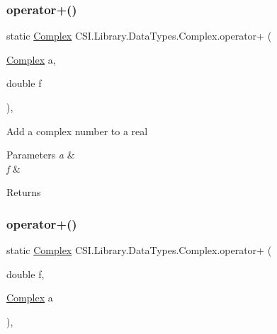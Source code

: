 \subsubsection{\texorpdfstring{operator+()}{operator+()}\hspace{0.1cm}{\footnotesize\ttfamily [1/3]}}
{\footnotesize\ttfamily static \mbox{\hyperlink{struct_c_s_i_1_1_library_1_1_data_types_1_1_complex}{Complex}} C\+S\+I.\+Library.\+Data\+Types.\+Complex.\+operator+ (\begin{DoxyParamCaption}\item[{\mbox{\hyperlink{struct_c_s_i_1_1_library_1_1_data_types_1_1_complex}{Complex}}}]{a,  }\item[{double}]{f }\end{DoxyParamCaption})\hspace{0.3cm}{\ttfamily [inline]}, {\ttfamily [static]}}



Add a complex number to a real 


\begin{DoxyParams}{Parameters}
{\em a} & \\
\hline
{\em f} & \\
\hline
\end{DoxyParams}
\begin{DoxyReturn}{Returns}

\end{DoxyReturn}
\mbox{\label{struct_c_s_i_1_1_library_1_1_data_types_1_1_complex_a1ba0b0b59df21c096c95b0f5228b5db7}} 
\subsubsection{\texorpdfstring{operator+()}{operator+()}\hspace{0.1cm}{\footnotesize\ttfamily [2/3]}}
{\footnotesize\ttfamily static \mbox{\hyperlink{struct_c_s_i_1_1_library_1_1_data_types_1_1_complex}{Complex}} C\+S\+I.\+Library.\+Data\+Types.\+Complex.\+operator+ (\begin{DoxyParamCaption}\item[{double}]{f,  }\item[{\mbox{\hyperlink{struct_c_s_i_1_1_library_1_1_data_types_1_1_complex}{Complex}}}]{a }\end{DoxyParamCaption})\hspace{0.3cm}{\ttfamily [inline]}, {\ttfamily [static]}}



